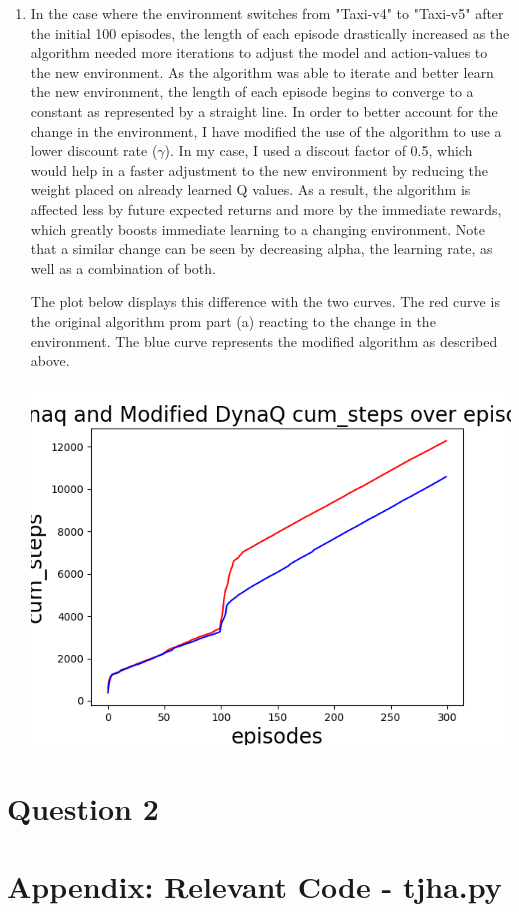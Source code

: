 \documentclass[11pt]{article}
\begin{document}
\begin{enumerate}[label=(\alph*)]
\item
In the case where the environment switches from "Taxi-v4" to "Taxi-v5" after the initial 100 episodes, the length of each episode drastically increased as the algorithm needed more iterations to adjust the model and action-values to the new environment. As the algorithm was able to iterate and better learn the new environment, the length of each episode begins to converge to a constant as represented by a straight line. In order to better account for the change in the environment, I have modified the use of the algorithm to use a lower discount rate ($\gamma$). In my case, I used a discout factor of 0.5, which would help in a faster adjustment to the new environment by reducing the weight placed on already learned Q values. As a result, the algorithm is affected less by future expected returns and more by the immediate rewards, which greatly boosts immediate learning to a changing environment. Note that a similar change can be seen by decreasing alpha, the learning rate, as well as a combination of both.

The plot below displays this difference with the two curves. The red curve is the original algorithm prom part (a) reacting to the change in the environment. The blue curve represents the modified algorithm as described above.

\includegraphics[scale=0.7]{Figure2.png}
\end{enumerate}

\section*{Question 2}


\section*{Appendix: Relevant Code - tjha.py}
   
\end{document}
